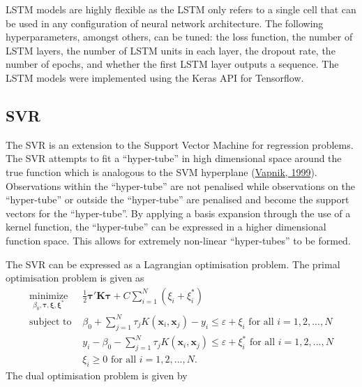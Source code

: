 \documentclass[11pt,preprint, authoryear]{elsarticle}
\numberwithin{equation}{section}
\numberwithin{figure}{section}
\numberwithin{table}{section}
\begin{document}
LSTM models are highly flexible as the LSTM only refers to a single cell
that can be used in any configuration of neural network architecture.
The following hyperparameters, amongst others, can be tuned: the loss
function, the number of LSTM layers, the number of LSTM units in each
layer, the dropout rate, the number of epochs, and whether the first
LSTM layer outputs a sequence. The LSTM models were implemented using
the Keras API for Tensorflow.

\hypertarget{svr}{%
\subsection{SVR}\label{svr}}

The SVR is an extension to the Support Vector Machine for regression
problems. The SVR attempts to fit a ``hyper-tube'' in high dimensional
space around the true function which is analogous to the SVM hyperplane
(\protect\hyperlink{ref-vapnik}{Vapnik, 1999}). Observations within the
``hyper-tube'' are not penalised while observations on the
``hyper-tube'' or outside the ``hyper-tube'' are penalised and become
the support vectors for the ``hyper-tube''. By applying a basis
expansion through the use of a kernel function, the ``hyper-tube'' can
be expressed in a higher dimensional function space. This allows for
extremely non-linear ``hyper-tubes'' to be formed.

\par

The SVR can be expressed as a Lagrangian optimisation problem. The
primal optimisation problem is given as \begin{equation}\label{SVR}
    \begin{array}{ll}
    \underset{\beta_0, \boldsymbol{\tau}, \boldsymbol{\xi},\boldsymbol{\xi^* }} {\text{minimize}} & \frac{1}{2} \boldsymbol{\tau ' K \tau} + C \sum_{i=1}^N (\xi_i + \xi_i^*)\\
        \text{subject to } & \beta_0 + \sum_{j=1}^N \tau_j K(\mathbf{x}_i,\mathbf{x}_j) - y_i \leq \varepsilon + \xi_i \text{ for all } i = 1,2,...,N\\
        & y_i - \beta_0 - \sum_{j=1}^N \tau_j K(\mathbf{x}_i,\mathbf{x}_j) \leq \varepsilon + \xi_i^* \text{ for all } i = 1,2,...,N \\
        & \xi_i \geq 0 \text{ for all } i =1,2,...,N.
    \end{array}
\end{equation} The dual optimisation problem is given by
\end{document}
